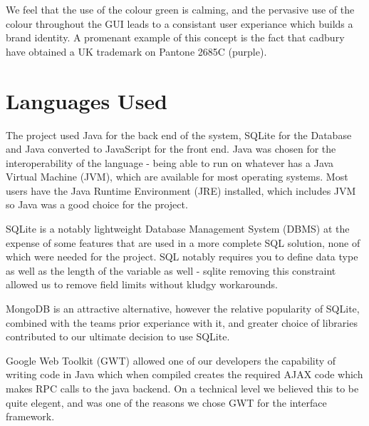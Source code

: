 We feel that the use of the colour green is calming, and the pervasive use of
the colour throughout the GUI leads to a consistant user experiance which builds
a brand identity. A promenant example of this concept is the fact that cadbury
have obtained a UK trademark on Pantone 2685C (purple).

\section{Languages Used}
The project used Java for the back end of the system, SQLite for the Database
and Java converted to JavaScript for the front end.  Java was chosen for the
interoperability of the language - being able to run on whatever has a Java
Virtual Machine (JVM), which are available for most operating systems.  Most
users have the Java Runtime Environment (JRE) installed, which includes JVM so
Java was a good choice for the project.

SQLite is a notably lightweight Database Management System (DBMS) at the expense
of some features that are used in a more complete SQL solution, none of which
were needed for the project.  SQL notably requires you to define data type as
well as the length of the variable as well - sqlite removing this constraint
allowed us to remove field limits without kludgy workarounds.

MongoDB is an attractive alternative, however the relative popularity of SQLite,
combined with the teams prior experiance with it, and greater choice of
libraries contributed to our ultimate decision to use SQLite.

Google Web Toolkit (GWT) allowed one of our developers the capability of writing
code in Java which when compiled creates the required AJAX code which makes RPC
calls to the java backend.  On a technical level we believed this to be quite
elegent, and was one of the reasons we chose GWT for the interface framework.

